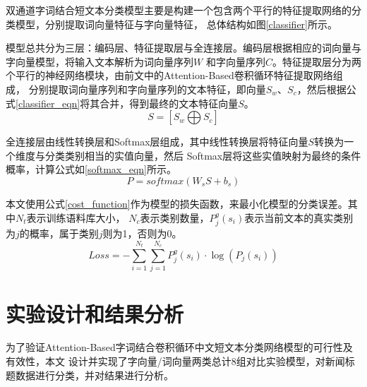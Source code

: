 双通道字词结合短文本分类模型主要是构建一个包含两个平行的特征提取网络的分类模型，分别提取词向量特征与字向量特征，
总体结构如图\ref{classifier}所示。

模型总共分为三层：编码层、特征提取层与全连接层。编码层根据相应的词向量与字向量模型，将输入文本解析为词向量序列$W$
和字向量序列$C$。特征提取层分为两个平行的神经网络模块，由前文中的Attention-Based卷积循环特征提取网络组成，
分别提取词向量序列和字向量序列的文本特征，即向量$S_w$、$S_c$，然后根据公式\ref{classifier_eqn}将其合并，得到最终的文本特征向量$S$。
\begin{equation}
    S =\left [ S_w\bigoplus S_c \right ]
    \label{classifier_eqn}
\end{equation}

全连接层由线性转换层和Softmax层组成，其中线性转换层将特征向量$S$转换为一个维度与分类类别相当的实值向量，然后
Softmax层将这些实值映射为最终的条件概率，计算公式如\ref{softmax_eqn}所示。
\begin{equation}
    P=softmax\left ( W_sS+b_s \right )
    \label{softmax_eqn}
\end{equation}

本文使用公式\ref{cost_function}作为模型的损失函数，来最小化模型的分类误差。其中$N_t$表示训练语料库大小，
$N_c$表示类别数量，$P_{j}^{g}\left ( s_i \right )$表示当前文本的真实类别为$j$的概率，属于类别$j$则为1，否则为0。
\begin{equation}
    Loss=-\sum_{i=1}^{N_t}\sum_{j=1}^{N_c}P_{j}^{g}\left ( s_i \right )\cdot\log\left ( P_j\left ( s_i \right ) \right )
    \label{cost_function}
\end{equation}
\section{实验设计和结果分析}
为了验证Attention-Based字词结合卷积循环中文短文本分类网络模型的可行性及有效性，本文
设计并实现了字向量/词向量两类总计8组对比实验模型，对新闻标题数据进行分类，并对结果进行分析。
